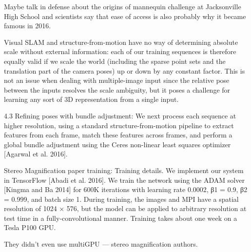 Maybe talk in defense about the origins of mannequin challenge at Jacksonville High School and scientists say that ease of access is also probably why it became famous in 2016.

Visual SLAM and structure-from-motion have no way of determining absolute scale without external information: each of our training sequences is therefore equally valid if we scale the world (including the sparse point sets and the translation part of the camera poses) up or down by any constant factor. This is not an issue when dealing with multiple-image input since the relative pose between the inputs resolves the scale ambiguity, but it poses a challenge for learning any sort of 3D representation from a single input.

4.3 Refining poses with bundle adjustment: 
We next process each sequence at higher resolution, using a standard structure-from-motion pipeline to extract features from each frame, match these features across frames, and perform a global bundle adjustment using the Ceres non-linear least squares optimizer [Agarwal et al. 2016].

Stereo Magnification paper training:
Training details. We implement our system in TensorFlow [Abadi et al. 2016]. We train the network using the ADAM solver [Kingma and Ba 2014] for 600K iterations with learning rate 0.0002, β1 = 0.9, β2 = 0.999, and batch size 1. During training, the images and MPI have a spatial resolution of 1024 × 576, but the model can be applied to arbitrary resolution at test time in a fully-convolutional manner. Training takes about one week on a Tesla P100 GPU.

They didn't even use multiGPU — stereo magnification authors.